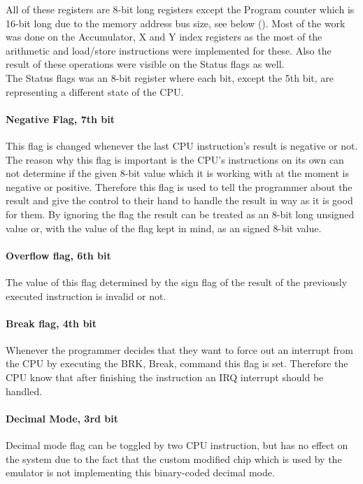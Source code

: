 \documentclass[]{report}
\begin{document}
All of these registers are 8-bit long registers except the Program counter which is 16-bit long due to the memory address bus size, see below (\cite{REG2}). Most of the work was done on the Accumulator, X and Y index registers
as the most of the arithmetic and load/store instructions were implemented for these. Also the result of these operations were visible on the Status flags as well. 
\\
The Status flags was an 8-bit register where each bit, except the 5th bit, are representing a different state of the CPU. 
\paragraph{Negative Flag, 7th bit}
This flag is changed whenever the last CPU instruction's result is negative or not. The reason why this flag is important is the CPU's instructions on its own can not determine if the given 8-bit value which it is working with at the moment is negative or positive. Therefore this flag is used to tell the programmer about the result and give the control to their hand to handle the result in way as it is good for them. By ignoring the flag the result can be treated as an 8-bit long unsigned value or, with the value of the flag kept in mind, as an signed 8-bit value.
\paragraph{Overflow flag, 6th bit}
The value of this flag determined by the sign flag of the result of the previously executed instruction is invalid or not.

\paragraph{Break flag, 4th bit}
Whenever the programmer decides that they want to force out an interrupt from the CPU by executing the BRK, Break, command this flag is set. Therefore the CPU know that after finishing the instruction an IRQ interrupt should be handled.

\paragraph{Decimal Mode, 3rd bit}
Decimal mode flag can be toggled by two CPU instruction, but has no effect on the system due to the fact that the custom modified chip which is used by the emulator is not implementing this binary-coded decimal mode.
\end{document}
